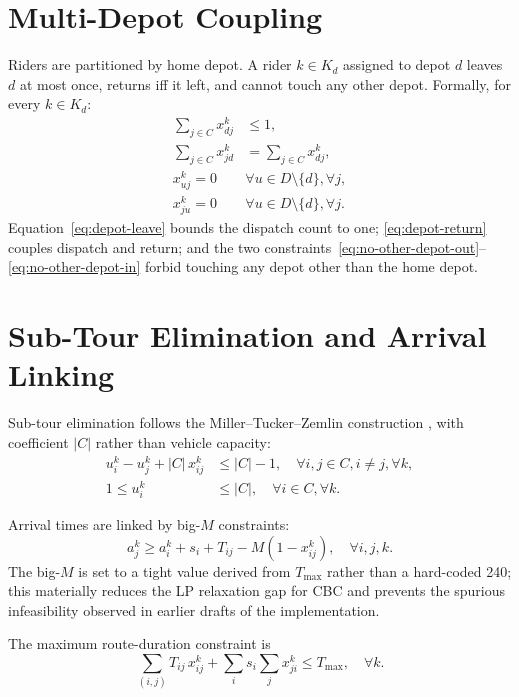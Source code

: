 \section{Multi-Depot Coupling}

Riders are partitioned by home depot. A rider $k \in K_d$ assigned to
depot $d$ leaves $d$ at most once, returns iff it left, and cannot
touch any other depot. Formally, for every $k \in K_d$:
\begin{align}
    \sum_{j \in C} x_{dj}^k &\leq 1, \label{eq:depot-leave} \\
    \sum_{j \in C} x_{jd}^k &= \sum_{j \in C} x_{dj}^k, \label{eq:depot-return} \\
    x_{uj}^k = 0 \quad &\forall u \in D \setminus \{d\}, \forall j, \label{eq:no-other-depot-out} \\
    x_{ju}^k = 0 \quad &\forall u \in D \setminus \{d\}, \forall j. \label{eq:no-other-depot-in}
\end{align}
Equation~\eqref{eq:depot-leave} bounds the dispatch count to one;
\eqref{eq:depot-return} couples dispatch and return; and the two
constraints~\eqref{eq:no-other-depot-out}--\eqref{eq:no-other-depot-in}
forbid touching any depot other than the home depot.

\section{Sub-Tour Elimination and Arrival Linking}

Sub-tour elimination follows the Miller--Tucker--Zemlin construction
\citep{miller1960}, with coefficient $|C|$ rather than vehicle
capacity:
\begin{align}
    u_i^k - u_j^k + |C| \, x_{ij}^k &\leq |C| - 1,
    \quad \forall i, j \in C, i \neq j, \forall k, \label{eq:mtz} \\
    1 \leq u_i^k &\leq |C|, \quad \forall i \in C, \forall k.
\end{align}

Arrival times are linked by big-$M$ constraints:
\begin{equation}
    a_j^k \geq a_i^k + s_i + T_{ij} - M(1 - x_{ij}^k),
    \quad \forall i, j, k. \label{eq:link}
\end{equation}
The big-$M$ is set to a tight value derived from $T_{\max}$ rather
than a hard-coded 240; this materially reduces the LP relaxation
gap for CBC and prevents the spurious infeasibility observed in
earlier drafts of the implementation.

The maximum route-duration constraint is
\begin{equation}
    \sum_{(i,j)} T_{ij} \, x_{ij}^k +
    \sum_{i} s_i \sum_{j} x_{ji}^k \leq T_{\max}, \quad \forall k. \label{eq:Tmax}
\end{equation}

